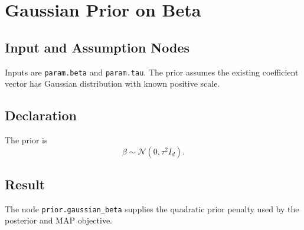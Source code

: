 \section{Gaussian Prior on Beta}
\label{prior:gaussian-beta}

\subsection{Input and Assumption Nodes}
Inputs are \texttt{param.beta} and \texttt{param.tau}. The prior assumes the existing coefficient vector has Gaussian distribution with known positive scale.

\subsection{Declaration}
The prior is
\[
  \beta \sim \mathcal{N}(0,\tau^2 I_d).
\]

\subsection{Result}
The node \texttt{prior.gaussian\_beta} supplies the quadratic prior penalty used by the posterior and MAP objective.
